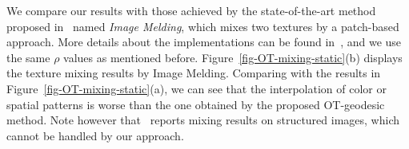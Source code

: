 We compare our results with those achieved by the state-of-the-art method proposed in~\cite{ImageMelding12} named \emph{Image Melding}, which mixes two textures by a patch-based approach. More details about the implementations can be found in~\cite{ImageMelding12}, and we use the same $\rho$ values as mentioned before.
Figure~\ref{fig-OT-mixing-static}(b) displays the texture mixing results by Image Melding.
Comparing with the results in Figure~\ref{fig-OT-mixing-static}(a), we can see that the interpolation of color or spatial patterns is worse than the one obtained by the proposed OT-geodesic method. Note however that~\cite{ImageMelding12} reports mixing results on structured images, which cannot be handled by our approach.


\newcommand{\DispTexture}[2]{ %
\texttt{[image: \#1-0-\#2]}&%
\texttt{[image: \#1-1-\#2]}&%
\texttt{[image: \#1-2-\#2]}&%
\texttt{[image: \#1-3-\#2]}&%
\texttt{[image: \#1-4-\#2]}&%
\texttt{[image: \#1-5-\#2]}&%
\texttt{[image: \#1-6-\#2]}&%
\texttt{[image: \#1-7-\#2]}%
}
\newcommand{\DispTextureR}[2]{ %
\texttt{[image: \#1-7-\#2]}&%
\texttt{[image: \#1-6-\#2]}&%
\texttt{[image: \#1-5-\#2]}&%
\texttt{[image: \#1-4-\#2]}&%
\texttt{[image: \#1-3-\#2]}&%
\texttt{[image: \#1-2-\#2]}&%
\texttt{[image: \#1-1-\#2]}&%
\texttt{[image: \#1-0-\#2]} %
}
\newcommand{\TabHeight}[1]{
	 \begin{tabular}{@{}c@{\hspace{1mm}}c@{\hspace{1mm}}c@{\hspace{1mm}}c@{\hspace{1mm}}c@{\hspace{1mm}}c@{\hspace{1mm}}c@{\hspace{1mm}}c@{\hspace{1mm}}@{}}
		#1
    \end{tabular}
}

